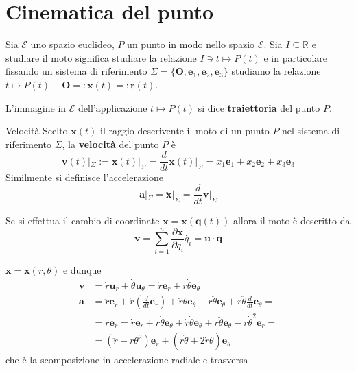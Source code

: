 \section{Cinematica del punto}
Sia \(\mathcal{E}\) uno spazio euclideo, \(P\) un punto in modo nello spazio
\(\mathcal{E}\). Sia \(I \subseteq \mathbb{R} \) e studiare il moto significa
studiare la relazione \(I \ni t \mapsto P{(t)}\) e in particolare fissando un
sistema di riferimento \(\Sigma = \{\mathbf{O} , \mathbf{e}_1, \mathbf{e}_2,
\mathbf{e}_3\}\) studiamo la relazione \(t \mapsto P{(t)} - \mathbf{O} =:
\mathbf{x} {(t)} =: \mathbf{r} {(t)}\).

L'immagine in \(\mathcal{E}\) dell'applicazione \(t \mapsto P{(t)}\) si dice
\textbf{traiettoria} del punto \(P\).

\begin{definition}{Velocità}
    Scelto \(\mathbf{x}{(t)}\) il raggio descrivente il moto di un punto \(P\)
    nel sistema di riferimento \(\Sigma\), la \textbf{velocità} del punto \(P\)
    è
    \[
        \mathbf{v}{(t)}|_\Sigma := \mathbf{\dot{x}}{(t)}|_\Sigma = \frac{d}{dt} \mathbf{x}
        {(t)}|_\Sigma = \dot{x_{1}} \mathbf{e}_1 + \dot{x_{2}} \mathbf{e}_2 +
        \dot{x_{3}} \mathbf{e}_3
    \]
    Similmente si definisce l'accelerazione 
    \[
        \mathbf{a} |_\Sigma = \mathbf{\ddot{x}}|_\Sigma = \frac{d}{dt}
        \mathbf{v}|_\Sigma
    \]
\end{definition}
Se si effettua il cambio di coordinate \(\mathbf{x} = \mathbf{x} {(\mathbf{q}
{(t)})}\) allora il moto è descritto da 
\[
    \mathbf{v} = \sum_{i=1}^{n} \frac{\partial \mathbf{x} }{\partial q_{i}}
    \dot{q_{i}} = \mathbf{u} \cdot \mathbf{\dot{q}} 
\]
\begin{example}
    \(\mathbf{x}  = \mathbf{x} {(r, \theta)}\) e dunque
    \begin{align*}
        \mathbf{v} &= \dot{r} \mathbf{u}_r + \dot{\theta} \mathbf{u}_\theta =
        \dot{r} \mathbf{e}_r + r \dot{\theta} \mathbf{e}_\theta\\
        \mathbf{a} &= \ddot{r} \mathbf{e}_r + \dot{r} {\left(
        \frac{d}{dt}\mathbf{e}_r  \right)} + \dot{r} \dot{\theta}
        \mathbf{e}_\theta + r \ddot{\theta} \mathbf{e}_\theta + r \ddot{\theta}
        \frac{d}{dt}\mathbf{e}_\theta = \\
                   &= \ddot{r} \mathbf{e}_r = \dot{r} \mathbf{e}_r +
                   \dot{r}\dot{\theta} \mathbf{e}_\theta + \dot{r} \dot{\theta}
                   \mathbf{e}_\theta + r\ddot{\theta}\mathbf{e}_\theta -
                   r\dot{\theta}^2 \mathbf{e}_r = \\
                   &= {\left( \ddot{r} - r \theta^2 \right)} \mathbf{e}_r +
                   {\left( r\ddot{\theta} + 2 \dot{r}\dot{\theta} \right)}
                   \mathbf{e} _\theta
    \end{align*}
    che è la scomposizione in accelerazione radiale e trasversa
\end{example}

